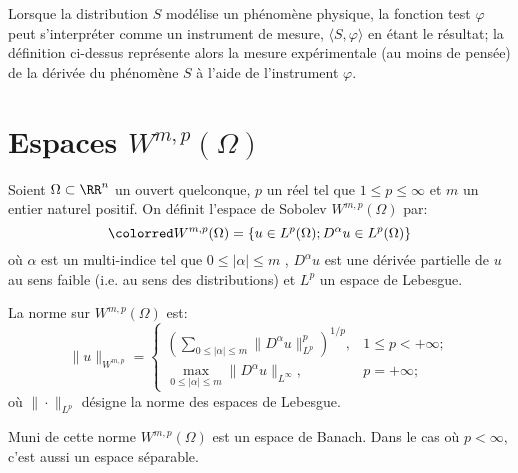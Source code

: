 Lorsque la distribution $S$ modélise un phénomène physique, la fonction test $\varphi$ peut
s'interpréter comme un instrument de mesure, $\langle S,\varphi\rangle$ en étant le résultat;
la définition ci-dessus représente alors la mesure expérimentale (au moins de pensée) de la
dérivée du phénomène $S$ à l'aide de l'instrument $\varphi$.


\medskip
{}





\medskip
\section{Espaces $W^{m,p}(\Omega)$}

\begin{definition}
Soient $\Omega \subset \RR^n$ un ouvert quelconque, $p$ un réel tel que $1\leqslant p\leqslant \infty$
et $m$ un entier naturel positif.
On définit l'espace de Sobolev $W^{m,p}(\Omega)$ par:
\begin{equation}\label{Eq-SoboW}\colorred
W^{m, p}(\Omega)=\{u\in L^p(\Omega); D^\alpha u \in L^p(\Omega)\}
\end{equation}
où $\alpha$ est un multi-indice tel que $0\leqslant |\alpha| \leqslant m$ , $D^\alpha u$ est une
dérivée partielle de $u$ au sens faible (i.e. au sens des distributions) et $L^p$ un espace de Lebesgue.
\end{definition}

\medskip
La norme sur $W^{m,p}(\Omega)$ est:
\begin{equation}
\| u \|_{W^{m, p}} = \begin{cases} \left( \sum \limits_{0\leqslant | \alpha | \leqslant m} \| D^{\alpha} u \|_{L^{p}}^{p} \right)^{1/p}, & 1 \leqslant p < + \infty; \\ \max\limits _{0\leqslant | \alpha | \leqslant m} \| D^{\alpha} u \|_{L^{\infty}}, & p = + \infty; \end{cases}
\end{equation}
où $\|\cdot\|_{L^{p}}$ désigne la norme des espaces de Lebesgue.

Muni de cette norme $W^{m,p}(\Omega)$ est un espace de Banach.
Dans le cas où $p<\infty$, c'est aussi un espace séparable.

